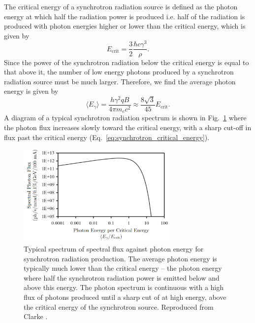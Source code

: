 \documentclass[../main.tex]{subfiles}
\begin{document}
The critical energy of a synchrotron radiation source is defined as the photon energy at which half the radiation power is produced i.e. half of the radiation is produced with photon energies higher or lower than the critical energy, which is given by
\begin{equation}
E_{\mathrm{crit}} = \frac{3}{2}\frac{\hbar c\gamma^{3}}{\rho}.
\label{eq:synchrotron_critical_energy}    
\end{equation}
Since the power of the synchrotron radiation below the critical energy is equal to that above it, the number of low energy photons produced by a synchrotron radiation source must be much larger. Therefore, we find the average photon energy is given by
\begin{equation}
\langle E_{\gamma} \rangle = \frac{h\gamma^{2}qB}{4\pi m_{e}c^{2}} \approx \frac{8\sqrt{3}}{45}E_{\mathrm{crit}}.
\label{eq:synchrotron_average_energy}    
\end{equation}
A diagram of a typical synchrotron radiation spectrum is shown in Fig.~\ref{fig:synchrotron_spectrum} where the photon flux increases slowly toward the critical energy, with a sharp cut-off in flux past the critical energy (Eq.~\ref{eq:synchrotron_critical_energy}).
\begin{figure}[!h]
\centering
\includegraphics[width=0.7\textwidth]{Figures/Introduction/synchrotron_radiation_spectrum.pdf}
\caption{Typical spectrum of spectral flux against photon energy for synchrotron radiation production. The average photon energy is typically much lower than the critical energy -- the photon energy where half the synchrotron radiation power is emitted below and above this energy. The photon spectrum is continuous with a high flux of photons produced until a sharp cut of at high energy, above the critical energy of the synchrotron source. Reproduced from Clarke \cite{clarke2016undulators}.}
\label{fig:synchrotron_spectrum}
\end{figure}
\end{document}
